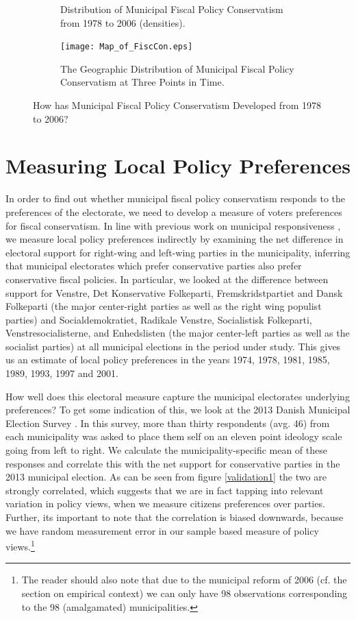\documentclass[a4paper,12pt]{article}
\begin{document}
\begin{figure}
\begin{subfigure}{0.38\textwidth}
	\caption{Distribution of Municipal Fiscal Policy Conservatism from 1978 to 2006 (densities).}
	\label{fig:lines}
	\end{subfigure}
		\begin{subfigure}{0.9\textwidth} 
	\texttt{[image: Map\_of\_FiscCon.eps]}
	\caption{The Geographic Distribution of Municipal Fiscal Policy Conservatism at Three Points in Time.}
	\label{fig:map}
		\end{subfigure} 
	
	\caption{How has Municipal Fiscal Policy Conservatism Developed from 1978 to 2006?}
	\label{fig:descriptive}
	
\end{figure}

\section{Measuring Local Policy Preferences}

In order to find out whether municipal fiscal policy conservatism responds to the preferences of the electorate, we need to develop a measure of voters preferences for fiscal conservatism. In line with previous work on municipal responsiveness \cite[e.g.,]{sances2017ideology,einstein2016pushing}, we measure local policy preferences indirectly by examining the net difference in electoral support for right-wing and left-wing parties in the municipality, inferring that municipal electorates which prefer conservative parties also prefer conservative fiscal policies. In particular, we looked at the difference between support for Venstre, Det Konservative Folkeparti, Fremskridstpartiet and Dansk Folkeparti (the major center-right parties as well as the right wing populist parties) and Socialdemokratiet, Radikale Venstre, Socialistisk Folkeparti, Venstresocialisterne, and Enhedslisten (the major center-left parties as well as the socialist parties) at all municipal elections in the period under study. This gives us an estimate of local policy preferences in the years 1974, 1978, 1981, 1985, 1989, 1993, 1997 and 2001. 

How well does this electoral measure capture the municipal electorates underlying preferences? To get some indication of this, we look at the 2013 Danish Municipal Election Survey \cite{elklit2017kv13}. In this survey, more than thirty respondents (avg. 46) from each municipality was asked to place them self on an eleven point ideology scale going from left to right. We calculate the municipality-specific mean of these responses and correlate this with the net support for conservative parties in the 2013 municipal election.  As can be seen from figure \ref{validation1} the two are strongly correlated, which suggests that we are in fact tapping into relevant variation in policy views, when we measure citizens preferences over parties. Further, its important to note that the correlation is biased downwards, because we have random measurement error in our sample based measure of policy views.\footnote{The reader should also note that due to the municipal reform of 2006 (cf. the section on empirical context) we can only have 98 observations corresponding to the 98 (amalgamated) municipalities.}
\end{document}
